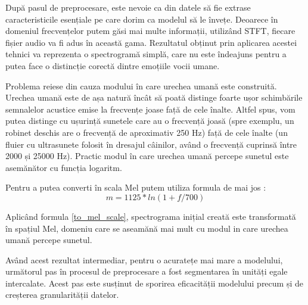 \documentclass[a4paper, 12pt]{report}
\begin{document}
	După pasul de preprocesare, este nevoie ca din datele să fie extrase caracteristicile esențiale pe care dorim ca modelul să le învețe. Deoarece în domeniul frecvențelor putem găsi mai multe informații, utilizând STFT, fiecare fișier audio va fi adus în această gama. Rezultatul obținut prin aplicarea acestei tehnici va reprezenta o spectrogramă simplă, care nu este îndeajuns pentru a putea face o distincție corectă dintre emoțiile vocii umane. 
	
	Problema reiese din cauza modului în care urechea umană este construită. Urechea umană este de așa natură încât să poată distinge foarte ușor schimbările semnalelor acustice emise la frecvențe joase față de cele înalte. Altfel spus, vom putea distinge cu ușurință sunetele care au o frecvență joasă (spre exemplu, un robinet deschis are o frecvență de aproximativ 250 Hz) față de cele înalte (un fluier cu ultrasunete folosit în dresajul câinilor, având o frecvență cuprinsă între 2000 și 25000 Hz). Practic modul în care urechea umană percepe sunetul este asemănător cu funcția logaritm.
	
	Pentru a putea converti în scala Mel putem utiliza formula de mai jos :
	\begin{equation}
	\label{to_mel_scale}
		m=1125 * ln(1+f/700)
	\end{equation}
	
	Aplicând formula \ref{to_mel_scale}, spectrograma inițial creată este transformată în spațiul Mel, domeniu care se aseamănă mai mult cu modul in care urechea umană percepe sunetul.
	
	Având acest rezultat intermediar, pentru o acuratețe mai mare a modelului, următorul pas în procesul de preprocesare a fost segmentarea în unități egale intercalate. Acest pas este susținut de sporirea eficacității modelului precum și de creșterea granularității datelor.
	
\end{document}
